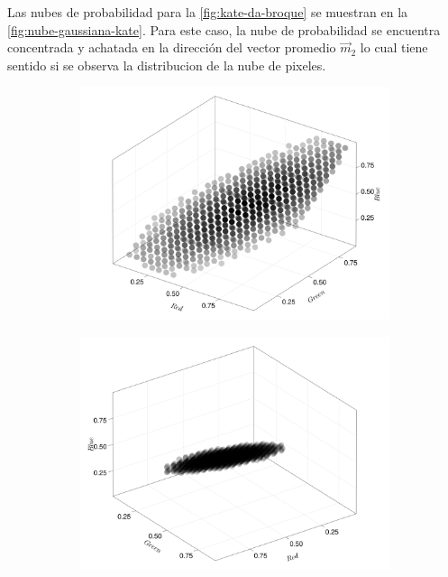 Las nubes de probabilidad para la \cref{fig:kate-da-broque} se muestran en la \cref{fig:nube-gaussiana-kate}. Para este caso, la nube de probabilidad se encuentra concentrada y achatada en la dirección del vector promedio $\vec{m}_2$ lo cual tiene sentido si se observa la distribucion de la nube de pixeles.
\begin{figure}[ht!]
    \centering
    \begin{subfigure}[c]{0.3\textwidth}
        \centering
        \includegraphics[scale=0.09]{../figures/gaussian_cloud_kate_1}
    \end{subfigure}
    \begin{subfigure}[c]{0.3\textwidth}
        \centering
        \includegraphics[scale=0.09]{../figures/gaussian_cloud_kate_2}

\end{subfigure}
\end{figure}
